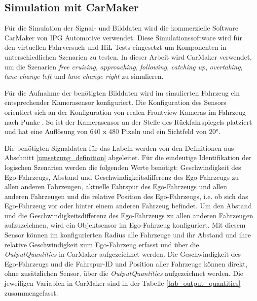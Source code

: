 \subsection{Simulation mit CarMaker}
\label{umsetzung_daten_synth_simulation}

Für die Simulation der Signal- und Bilddaten wird die kommerzielle Software CarMaker von IPG Automotive \cite{ipg2018carmaker} verwendet. Diese Simulationssoftware wird für den virtuellen Fahrversuch und \ac{HiL}-Tests eingesetzt um Komponenten in unterschiedlichen Szenarien zu testen. In dieser Arbeit wird CarMaker verwendet, um die Szenarien \textit{free cruising}, \textit{approaching}, \textit{following}, \textit{catching up}, \textit{overtaking}, \textit{lane change left} und \textit{lane change right} zu simulieren.

Für die Aufnahme der benötigten Bilddaten wird im simulierten Fahrzeug ein entsprechender Kamerasensor konfiguriert. Die Konfiguration des Sensors orientiert sich an der Konfiguration von realen Frontview-Kameras im Fahrzeug nach Punke \cite{punke2015kamera}. So ist der Kamerasensor an der Stelle des Rückfahrspiegels platziert und hat eine Auflösung von 640 x 480 Pixeln und ein Sichtfeld von 20°.

Die benötigten Signaldaten für das Labeln werden von den Definitionen aus Abschnitt \ref{umsetzung_definition} abgeleitet. Für die eindeutige Identifikation der logischen Szenarien werden die folgenden Werte benötigt: Geschwindigkeit des Ego-Fahrzeugs, Abstand und Geschwindigkeitsdifferenz des Ego-Fahrzeugs zu allen anderen Fahrzeugen, aktuelle Fahrspur des Ego-Fahrzeugs und allen anderen Fahrzeugen und die relative Position des Ego-Fahrzeugs, i.e. ob sich das Ego-Fahrzeug vor oder hinter einem anderen Fahrzeug befindet. Um den Abstand und die Geschwindigkeitsdifferenz des Ego-Fahrzeugs zu allen anderen Fahrzeugen aufzuzeichnen, wird ein Objektsensor im Ego-Fahrzeug konfiguriert. Mit diesem Sensor können im konfigurierten Radius alle Fahrzeuge und ihr Abstand und ihre relative Geschwindigkeit zum Ego-Fahrzeug erfasst und über die \textit{OutputQuantities} in CarMaker aufgezeichnet werden. Die Geschwindigkeit des Ego-Fahrzeugs und die Fahrspur-ID und Position aller Fahrzeuge können direkt, ohne zusätzlichen Sensor, über die \textit{OutputQuantities} aufgezeichnet werden. Die jeweiligen Variablen in CarMaker sind in der Tabelle \ref{tab_output_quantities} zusammengefasst.

